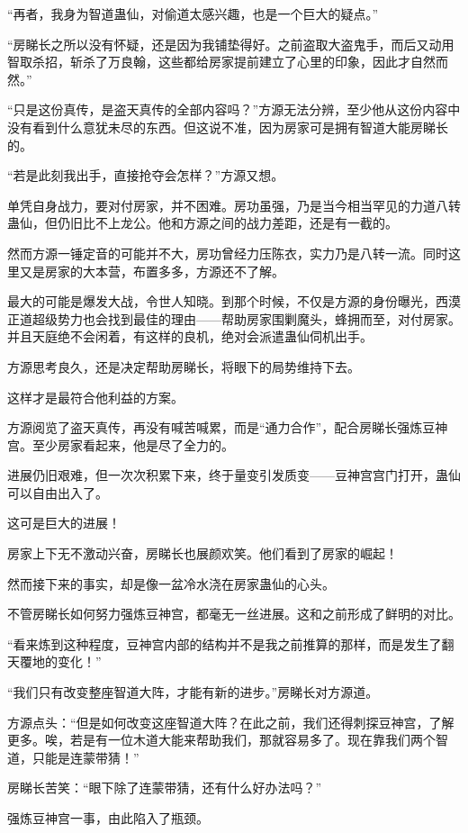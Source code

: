 \begin{this_body}
“再者，我身为智道蛊仙，对偷道太感兴趣，也是一个巨大的疑点。”

“房睇长之所以没有怀疑，还是因为我铺垫得好。之前盗取大盗鬼手，而后又动用智取杀招，斩杀了万良翰，这些都给房家提前建立了心里的印象，因此才自然而然。”

“只是这份真传，是盗天真传的全部内容吗？”方源无法分辨，至少他从这份内容中没有看到什么意犹未尽的东西。但这说不准，因为房家可是拥有智道大能房睇长的。

“若是此刻我出手，直接抢夺会怎样？”方源又想。

单凭自身战力，要对付房家，并不困难。房功虽强，乃是当今相当罕见的力道八转蛊仙，但仍旧比不上龙公。他和方源之间的战力差距，还是有一截的。

然而方源一锤定音的可能并不大，房功曾经力压陈衣，实力乃是八转一流。同时这里又是房家的大本营，布置多多，方源还不了解。

最大的可能是爆发大战，令世人知晓。到那个时候，不仅是方源的身份曝光，西漠正道超级势力也会找到最佳的理由——帮助房家围剿魔头，蜂拥而至，对付房家。并且天庭绝不会闲着，有这样的良机，绝对会派遣蛊仙伺机出手。

方源思考良久，还是决定帮助房睇长，将眼下的局势维持下去。

这样才是最符合他利益的方案。

方源阅览了盗天真传，再没有喊苦喊累，而是“通力合作”，配合房睇长强炼豆神宫。至少房家看起来，他是尽了全力的。

进展仍旧艰难，但一次次积累下来，终于量变引发质变——豆神宫宫门打开，蛊仙可以自由出入了。

这可是巨大的进展！

房家上下无不激动兴奋，房睇长也展颜欢笑。他们看到了房家的崛起！

然而接下来的事实，却是像一盆冷水浇在房家蛊仙的心头。

不管房睇长如何努力强炼豆神宫，都毫无一丝进展。这和之前形成了鲜明的对比。

“看来炼到这种程度，豆神宫内部的结构并不是我之前推算的那样，而是发生了翻天覆地的变化！”

“我们只有改变整座智道大阵，才能有新的进步。”房睇长对方源道。

方源点头：“但是如何改变这座智道大阵？在此之前，我们还得刺探豆神宫，了解更多。唉，若是有一位木道大能来帮助我们，那就容易多了。现在靠我们两个智道，只能是连蒙带猜！”

房睇长苦笑：“眼下除了连蒙带猜，还有什么好办法吗？”

强炼豆神宫一事，由此陷入了瓶颈。


\end{this_body}
